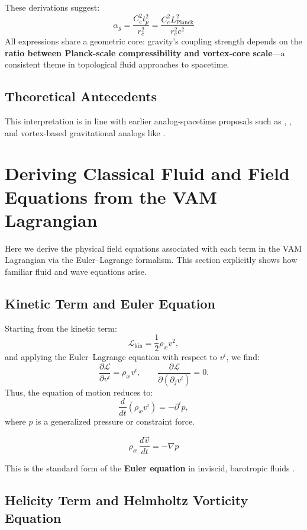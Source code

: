 \documentclass[12pt]{article}
\begin{document}
These derivations suggest:
\[
    \boxed{
        \alpha_g = \frac{C_e^2 t_p^2}{r_c^2} = \frac{C_e^2 L_{\text{Planck}}^2}{r_c^2 c^2}
    }
\]
All expressions share a geometric core: gravity's coupling strength depends on the \textbf{ratio between Planck-scale compressibility and vortex-core scale}—a consistent theme in topological fluid approaches to spacetime.

\subsection*{Theoretical Antecedents}

This interpretation is in line with earlier analog-spacetime proposals such as \cite{barcelo2011}, \cite{volovik2003universe}, and vortex-based gravitational analogs like \cite{ranada1989topological}.
\section{Deriving Classical Fluid and Field Equations from the VAM Lagrangian}

Here we derive the physical field equations associated with each term in the VAM Lagrangian via the Euler–Lagrange formalism. This section explicitly shows how familiar fluid and wave equations arise.

\subsection*{Kinetic Term and Euler Equation}

Starting from the kinetic term:
\[
    \mathcal{L}_{\text{kin}} = \frac{1}{2} \rho_\text{\ae} v^2,
\]
and applying the Euler--Lagrange equation with respect to $v^i$, we find:
\[
    \frac{\partial \mathcal{L}}{\partial v^i} = \rho_\text{\ae} v^i, \qquad
    \frac{\partial \mathcal{L}}{\partial (\partial_j v^i)} = 0.
\]
Thus, the equation of motion reduces to:
\[
    \frac{d}{dt}(\rho_\text{\ae} v^i) = -\partial^i p,
\]
where \( p \) is a generalized pressure or constraint force.

\begin{equation}
    \boxed{
        \rho_\text{\ae}\, \frac{d \vec{v}}{dt} = -\nabla p
    }
\end{equation}

This is the standard form of the \textbf{Euler equation} in inviscid, barotropic fluids \cite{khalatnikov2000}.

\subsection*{Helicity Term and Helmholtz Vorticity Equation}
\end{document}
